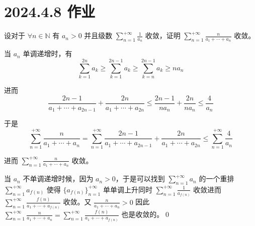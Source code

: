 \ifx\allfiles\undefined

\date{}
\author{尹锦润}

\maketitle
\fi

\section{2024.4.8 作业}

\begin{ques}
	设对于 $\displaystyle \forall n\in \mathbb{N}$ 有 $\displaystyle a_{n}  >0$ 并且级数 $\displaystyle \sum _{n=1}^{+\infty }\frac{1}{a_{n}}$ 收敛，证明 $\displaystyle \sum _{n=1}^{+\infty }\frac{n}{a_{1} +\cdots +a_{n}}$ 收敛。
\end{ques}





当 $\displaystyle a_{n}$ 单调递增时，有
\begin{equation*}
	\sum _{k=1}^{2n} a_{k} \geqslant \sum _{k=1}^{2n-1} a_{k} \geqslant \sum _{k=n}^{2n-1} a_{k} \geqslant na_{n}
\end{equation*}


进而
\begin{equation*}
	\frac{2n-1}{a_{1} +\cdots +a_{2n-1}} +\frac{2n}{a_{1} +\cdots +a_{2n}} \leqslant \frac{2n-1}{na_{n}} +\frac{2n}{na_{n}} \leqslant \frac{4}{a_{n}}
\end{equation*}


于是
\begin{equation*}
	\sum _{n=1}^{+\infty }\frac{n}{a_{1} +\cdots +a_{n}} =\sum _{n=1}^{+\infty }\frac{2n-1}{a_{1} +\cdots +a_{2n-1}} +\frac{2n}{a_{1} +\cdots +a_{2n}} \leqslant \sum _{n=1}^{+\infty }\frac{4}{a_{n}}
\end{equation*}


进而 $\displaystyle \sum _{n=1}^{+\infty }\frac{n}{a_{1} +\cdots +a_{n}}$ 收敛。

当 $\displaystyle a_{n}$ 不单调递增时候，因为 $\displaystyle a_{n}  >0$，于是可以找到 $\displaystyle \sum _{n=1}^{+\infty } a_{n}$ 的一个重排 $\displaystyle \sum _{n=1}^{+\infty } a_{f( n)}$ 使得 $\displaystyle \{a_{f( n)}\}_{n=1}^{+\infty }$ 单单调上升同时 $\displaystyle \sum _{n=1}^{+\infty }\frac{1}{a_{f( n)}}$ 收敛进而 $\displaystyle \sum _{n=1}^{+\infty }\frac{f( n)}{a_{1} +\cdots +a_{f( n)}}$ 收敛。又 $\displaystyle \frac{n}{a_{1} +\cdots +a_{n}}  >0$ 因此 $\displaystyle \sum _{n=1}^{+\infty }\frac{n}{a_{1} +\cdots +a_{n}} =\sum _{n=1}^{+\infty }\frac{f( n)}{a_{1} +\cdots +a_{f( n)}}$ 也是收敛的。\qed 





